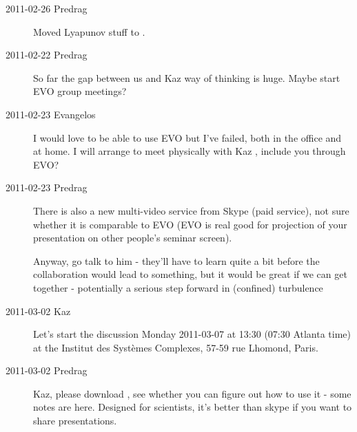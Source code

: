 \begin{description}

\item[2011-02-26 Predrag] Moved Lyapunov stuff to
    .


\item[2011-02-22 Predrag]
So far the gap between us and Kaz way of thinking is huge.
Maybe start EVO group meetings?

\item[2011-02-23 Evangelos]
I would love to be able to use EVO but I've
    failed, both in the office and at home. I will arrange to meet
    physically with Kaz \etal, include you
    through EVO?

\item[2011-02-23 Predrag]
There is also a new multi-video service from Skype (paid service), not
sure whether it is comparable to EVO (EVO is real good for projection of
your presentation on other people's seminar screen).

Anyway, go talk to him - they'll have to learn quite a bit before the
collaboration would lead to something, but it would be great if we can
get together - potentially a serious step forward in (confined)
turbulence

\item[2011-03-02 Kaz] Let's start the discussion
 Monday 2011-03-07 at 13:30 (07:30 Atlanta time) at the Institut des Syst\`emes Complexes, 57-59 rue Lhomond, Paris.

\item[2011-03-02 Predrag] Kaz, please download
, see whether you can
figure out how to use it - some notes are
{here}. Designed for scientists, it's better than skype if you want to
share presentations.


\end{description}
